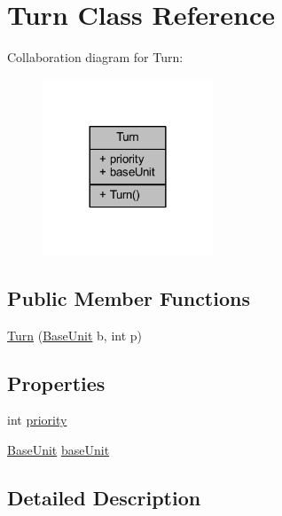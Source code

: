 \hypertarget{class_turn}{}\section{Turn Class Reference}
\label{class_turn}


Collaboration diagram for Turn\+:
\nopagebreak
\begin{figure}[H]
\begin{center}
\leavevmode
\includegraphics[width=144pt]{class_turn__coll__graph}
\end{center}
\end{figure}
\subsection*{Public Member Functions}
\begin{DoxyCompactItemize}
\item 
\mbox{\hyperlink{class_turn_a6446f2b617305c390dce97e1c7242066}{Turn}} (\mbox{\hyperlink{class_base_unit}{Base\+Unit}} b, int p)
\end{DoxyCompactItemize}
\subsection*{Properties}
\begin{DoxyCompactItemize}
\item 
int \mbox{\hyperlink{class_turn_aad40e669aa7299a23aa01c1756edd975}{priority}}
\item 
\mbox{\hyperlink{class_base_unit}{Base\+Unit}} \mbox{\hyperlink{class_turn_a59d549b1393677617e4237dcab3e27f9}{base\+Unit}}
\end{DoxyCompactItemize}


\subsection{Detailed Description}


